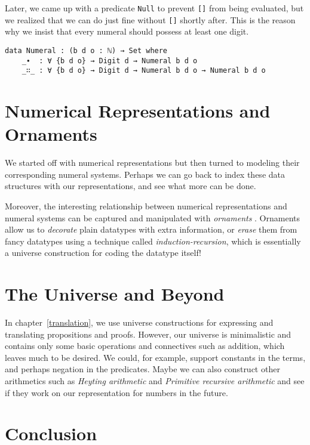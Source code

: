 \documentclass[\main/thesis.tex]{subfiles}
\begin{document}
Later, we came up with a predicate \lstinline|Null| to prevent \lstinline|[]|
from being evaluated, but we realized that we can do just fine without
\lstinline|[]| shortly after.
This is the reason why we insist that every numeral should possess at least one
digit.

\begin{lstlisting}
data Numeral : (b d o : ℕ) → Set where
    _∙  : ∀ {b d o} → Digit d → Numeral b d o
    _∷_ : ∀ {b d o} → Digit d → Numeral b d o → Numeral b d o
\end{lstlisting}

\section{Numerical Representations and Ornaments}

We started off with numerical representations but then turned to
modeling their corresponding numeral systems.
Perhaps we can go back to index these data structures with our representations,
and see what more can be done.

Moreover, the interesting relationship between numerical representations
and numeral systems can be captured and manipulated with \textit{ornaments}
\cite{mcbride2010ornamental}.
Ornaments allow us to \textit{decorate} plain datatypes with extra information,
or \textit{erase} them from fancy datatypes using a technique called
\textit{induction-recursion}\cite{dybjer1999finite}, which is essentially
a universe construction for coding the datatype itself!

\section{The Universe and Beyond}

In chapter~\ref{translation}, we use universe constructions for expressing and
translating propositions and proofs.
However, our universe is minimalistic and contains only some basic operations
and connectives such as addition, which leaves much to be desired.
We could, for example, support constants in the terms, and perhaps negation in
the predicates.
Maybe we can also construct other arithmetics such as
\textit{Heyting arithmetic} and \textit{Primitive recursive arithmetic}
and see if they work on our representation for numbers in the future.

\section{Conclusion}
\end{document}
